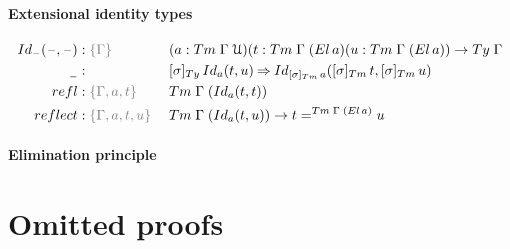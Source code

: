 \documentclass[a4paper,UKenglish,numberwithinsect,cleveref,thm-restate]{lipics-v2021}
\newcommand{\Fredrik}[2][]{\todo[inline,author={Fred},caption={},#1]{#2}}
\begin{document}
\paragraph*{Extensional identity types}

\begin{alignat*}{5}
  \idtype[\blank]{\blank}{\blank} & : \implicit{\Gamma} && (a : \Tm\;\Gamma\;\UU) (t : \Tm\;\Gamma\;(\El\,a)(u : \Tm\;\Gamma\;(\El\,a)) \to \Ty\;\Gamma \\
  \nameless & : && [ \sigma ]_{\Ty}\, \idtype[a]{t}{u} \reduce \idtype[{[\sigma]_{\Tm}\,a}]{[\sigma]_{\Tm}\,t}{[\sigma]_{\Tm}\,u} \\
  \mathsf{refl} & : \implicit{\Gamma, a, t}\;&&\Tm\;\Gamma\;(\idtype[a]{t}{t}) \\
  \mathsf{reflect} & : \implicit{\Gamma, a, t, u}\;&& \Tm\;\Gamma\;(\idtype[a]{t}{u}) \to t =^{\Tm\;\Gamma\;(\El\,a)} u
\end{alignat*}

\paragraph*{Elimination principle}

\Fredrik{TODO}

\section{Omitted proofs}
\end{document}
